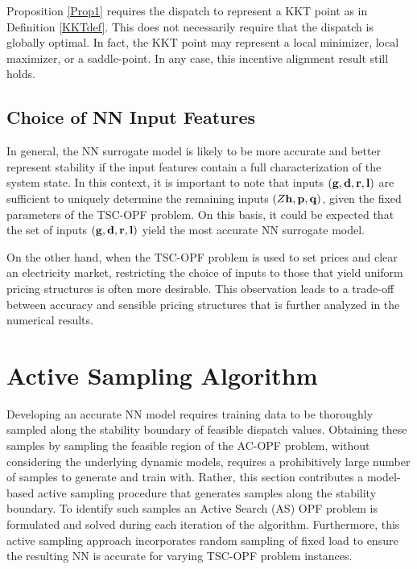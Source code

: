 \documentclass[lettersize,journal]{IEEEtran}
\begin{document}
Proposition \ref{Prop1} requires the dispatch to represent a KKT point as in Definition \ref{KKTdef}.  This does not necessarily require that the dispatch is globally optimal.  In fact, the KKT point may represent a local minimizer, local maximizer, or a saddle-point.  In any case, this incentive alignment result still holds.   

\subsection{Choice of NN Input Features}

In general, the NN surrogate model is likely to be more accurate and better represent stability if the input features contain a full characterization of the system state.  In this context, it is important to note that inputs $(\bold{g},\bold{d},\bold{r},\bold{l})$ are sufficient to uniquely determine the remaining inputs $(Z\bold{h},\bold{p},\bold{q})$, given the fixed parameters of the TSC-OPF problem.  On this basis, it could be expected that the set of inputs $(\bold{g},\bold{d},\bold{r},\bold{l})$ yield the most accurate NN surrogate model.

On the other hand, when the TSC-OPF problem is used to set prices and clear an electricity market, restricting the choice of inputs to those that yield uniform pricing structures is often more desirable.  This observation leads to a trade-off between accuracy and sensible pricing structures that is further analyzed in the numerical results.




\section{Active Sampling Algorithm}\label{SecIII}
Developing an accurate NN model requires training data to be thoroughly sampled along the stability boundary of feasible dispatch values.  Obtaining these samples by sampling the feasible region of the AC-OPF problem, without considering the underlying dynamic models, requires a prohibitively large number of samples to generate and train with.  Rather, this section contributes a model-based active sampling procedure that generates samples along the stability boundary. To identify such samples an Active Search (AS) OPF problem is formulated and solved during each iteration of the algorithm.  Furthermore, this active sampling approach incorporates random sampling of fixed load to ensure the resulting NN is accurate for varying TSC-OPF problem instances.
\end{document}

